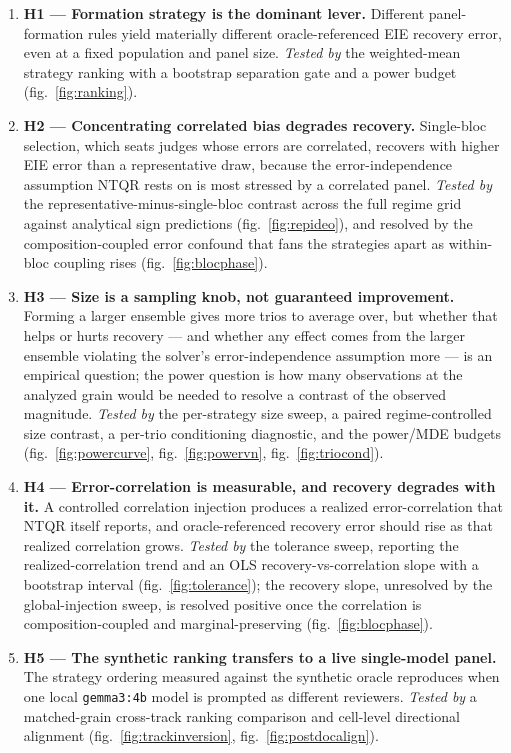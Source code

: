 \documentclass[
]{article}
\providecommand{\tightlist}{%
  \setlength{\itemsep}{0pt}\setlength{\parskip}{0pt}}
\begin{document}
\begin{enumerate}
\def\labelenumi{\arabic{enumi}.}
\tightlist
\item
  \textbf{H1 --- Formation strategy is the dominant lever.} Different
  panel-formation rules yield materially different oracle-referenced EIE
  recovery error, even at a fixed population and panel size.
  \emph{Tested by} the weighted-mean strategy ranking with a bootstrap
  separation gate and a power budget (fig.~\ref{fig:ranking}).
\item
  \textbf{H2 --- Concentrating correlated bias degrades recovery.}
  Single-bloc selection, which seats judges whose errors are correlated,
  recovers with higher EIE error than a representative draw, because the
  error-independence assumption NTQR rests on is most stressed by a
  correlated panel. \emph{Tested by} the
  representative-minus-single-bloc contrast across the full regime grid
  against analytical sign predictions (fig.~\ref{fig:repideo}), and
  resolved by the composition-coupled error confound that fans the
  strategies apart as within-bloc coupling rises
  (fig.~\ref{fig:blocphase}).
\item
  \textbf{H3 --- Size is a sampling knob, not guaranteed improvement.}
  Forming a larger ensemble gives more trios to average over, but
  whether that helps or hurts recovery --- and whether any effect comes
  from the larger ensemble violating the solver's error-independence
  assumption more --- is an empirical question; the power question is
  how many observations at the analyzed grain would be needed to resolve
  a contrast of the observed magnitude. \emph{Tested by} the
  per-strategy size sweep, a paired regime-controlled size contrast, a
  per-trio conditioning diagnostic, and the power/MDE budgets
  (fig.~\ref{fig:powercurve}, fig.~\ref{fig:powervn},
  fig.~\ref{fig:triocond}).
\item
  \textbf{H4 --- Error-correlation is measurable, and recovery degrades
  with it.} A controlled correlation injection produces a realized
  error-correlation that NTQR itself reports, and oracle-referenced
  recovery error should rise as that realized correlation grows.
  \emph{Tested by} the tolerance sweep, reporting the
  realized-correlation trend and an OLS recovery-vs-correlation slope
  with a bootstrap interval (fig.~\ref{fig:tolerance}); the recovery
  slope, unresolved by the global-injection sweep, is resolved positive
  once the correlation is composition-coupled and marginal-preserving
  (fig.~\ref{fig:blocphase}).
\item
  \textbf{H5 --- The synthetic ranking transfers to a live single-model
  panel.} The strategy ordering measured against the synthetic oracle
  reproduces when one local \texttt{gemma3:4b} model is prompted as
  different reviewers. \emph{Tested by} a matched-grain cross-track
  ranking comparison and cell-level directional alignment
  (fig.~\ref{fig:trackinversion}, fig.~\ref{fig:postdocalign}).
\end{enumerate}
\end{document}
